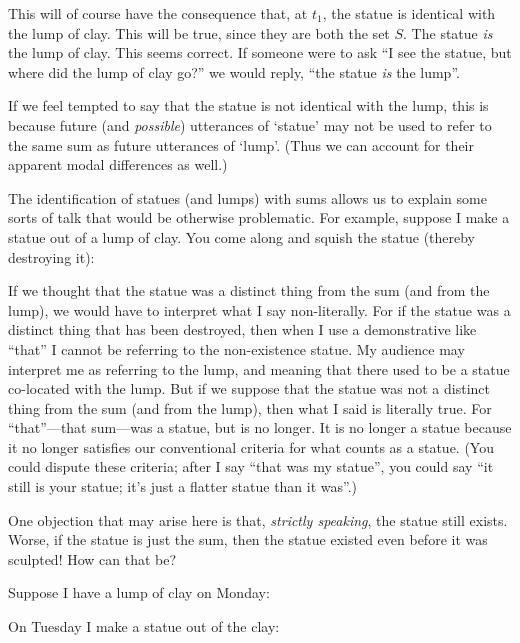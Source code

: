 \documentclass[11pt]{article}
\begin{document}
\begin{spacing}{1.5}
This will of course have the consequence that, at $t_1$, the statue is
identical with the lump of clay.  This will be true, since they are
both the set $S$.  The statue {\em is} the lump of clay.  This seems
correct.  If someone were to ask ``I see the statue, but where did the
lump of clay go?'' we would reply, ``the statue {\em is} the lump''.

If we feel tempted to say that the statue is not identical with the
lump, this is because future (and {\em possible}) utterances of
`statue' may not be used to refer to the same sum as future utterances
of `lump'.  (Thus we can account for their apparent modal differences
as well.)

The identification of statues (and lumps) with sums allows us to
explain some sorts of talk that would be otherwise problematic.  For
example, suppose I make a statue out of a lump of clay.  You come
along and squish the statue (thereby destroying it):


If we thought that the statue was a distinct thing from the sum (and
from the lump), we would have to interpret what I say non-literally.
For if the statue was a distinct thing that has been destroyed, then
when I use a demonstrative like ``that'' I cannot be referring to the
non-existence statue.  My audience may interpret me as referring to
the lump, and meaning that there used to be a statue co-located with
the lump.  But if we suppose that the statue was not a distinct thing
from the sum (and from the lump), then what I said is literally true.
For ``that''---that sum---was a statue, but is no longer.  It is no
longer a statue because it no longer satisfies our conventional
criteria for what counts as a statue.  (You could dispute these
criteria; after I say ``that was my statue'', you could say ``it still
is your statue; it's just a flatter statue than it was''.)

One objection that may arise here is that, {\em strictly speaking},
the statue still exists.  Worse, if the statue is just the sum, then
the statue existed even before it was sculpted!  How can that be?

Suppose I have a lump of clay on Monday:


On Tuesday I make a statue out of the clay:



\end{spacing}
\end{document}
